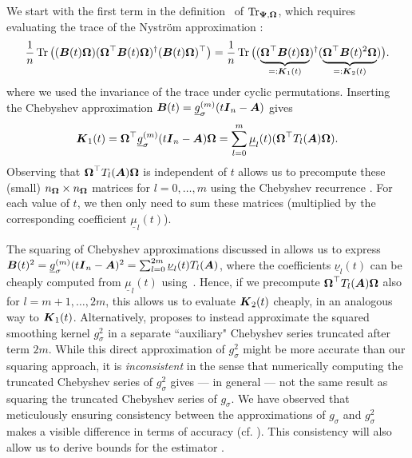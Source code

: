 We start with the first term in the definition~ of $\operatorname{Tr}_{\boldsymbol{\Psi}, \boldsymbol{\Omega}}$, which requires evaluating the trace of the 
Nyström approximation :
\begin{equation}
    \frac{1}{n} \operatorname{Tr} \big((\boldsymbol{B}(t) \boldsymbol{\Omega}) (\boldsymbol{\Omega}^{\top} \boldsymbol{B}(t) \boldsymbol{\Omega})^{\dagger} (\boldsymbol{B}(t) \boldsymbol{\Omega})^{\top} \big) =
    \frac{1}{n} \operatorname{Tr} \big((\underbrace{\boldsymbol{\Omega}^{\top} \boldsymbol{B}(t) \boldsymbol{\Omega}}_{=: \boldsymbol{K}_1(t)})^{\dagger} (\underbrace{\boldsymbol{\Omega}^{\top} \boldsymbol{B}(t)^2 \boldsymbol{\Omega}}_{=: \boldsymbol{K}_2(t)}) \big).
    \label{equ:cyclic-property}
\end{equation}
where we used the invariance of the trace under cyclic permutations.
Inserting the Chebyshev approximation  $\boldsymbol{B}(t) = \underline{g}_{\sigma}^{(m)}(t \boldsymbol{I}_n - \boldsymbol{A})$ gives
\begin{equation*}
    \boldsymbol{K}_1(t) = \boldsymbol{\Omega}^{\top} \underline{g}_{\sigma}^{(m)}(t \boldsymbol{I}_n - \boldsymbol{A}) \boldsymbol{\Omega} = \sum_{l=0}^{m} \underline{\mu}_l(t) (\boldsymbol{\Omega}^{\top} T_l(\boldsymbol{A}) \boldsymbol{\Omega}).
\end{equation*}
Observing that $\boldsymbol{\Omega}^{\top} T_l(\boldsymbol{A}) \boldsymbol{\Omega}$ is independent of $t$ allows us to precompute these (small) $n_{\boldsymbol{\Omega}} \times n_{\boldsymbol{\Omega}}$ matrices for $l=0, \dots, m$ using the Chebyshev recurrence . For each value of $t$, we then only need to sum these matrices (multiplied by the corresponding coefficient $\underline{\mu}_l(t)$).

The squaring of Chebyshev approximations discussed in  allows us to express $\boldsymbol{B}(t)^2 = \underline{g}_{\sigma}^{(m)}(t \boldsymbol{I}_n - \boldsymbol{A})^2 = \sum_{l=0}^{2m} \underline{\nu}_l(t) T_l(\boldsymbol{A})$, where the coefficients $\underline{\nu}_l(t)$ can be cheaply computed from $\underline{\mu}_l(t)$ using~. Hence, if we precompute
$\boldsymbol{\Omega}^{\top} T_l(\boldsymbol{A}) \boldsymbol{\Omega}$
also for $l=m+1, \dots, 2m$, this allows us to evaluate $\boldsymbol{K}_2(t)$ cheaply, in an analogous way to $\boldsymbol{K}_1(t)$. Alternatively, \cite{lin-2017-randomized-estimation} proposes to instead approximate the squared smoothing kernel $g_{\sigma}^2$ in a separate ``auxiliary" Chebyshev series truncated after term $2m$. While this direct approximation of $g_{\sigma}^2$ might be more accurate than our squaring approach, it is \emph{inconsistent} in the sense that numerically computing the truncated Chebyshev series of $g_{\sigma}^2$ gives --- in general --- not the same result as squaring the truncated Chebyshev series of $g_{\sigma}$. We have observed that meticulously ensuring consistency between the approximations of $g_{\sigma}$ and $g_{\sigma}^2$ makes a visible difference in terms of accuracy (cf. ). This consistency will also allow us to derive bounds for the estimator .

